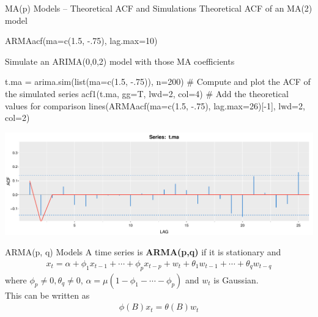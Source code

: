 \documentclass[ignorenonframetext,xcolor=x11names]{beamer}
\begin{document}
\begin{frame}[fragile]{MA(p) Models -- Theoretical ACF and Simulations}
Theoretical ACF of an MA(2) model
\begin{Rcode}
ARMAacf(ma=c(1.5, -.75), lag.max=10)
\end{Rcode}
Simulate an ARIMA(0,0,2) model with those MA coefficients
\begin{Rcode}
t.ma = arima.sim(list(ma=c(1.5, -.75)), n=200)
# Compute and plot the ACF of the simulated series
acf1(t.ma, gg=T, lwd=2, col=4)
# Add the theoretical values for comparison
lines(ARMAacf(ma=c(1.5, -.75), lag.max=26)[-1], 
      lwd=2, col=2)
\end{Rcode}
\begin{center}
\includegraphics[width=.75\textwidth]{figure19.pdf}
\end{center}
\end{frame}



\begin{frame}{ARMA(p, q) Models}
A time series is \textbf{ARMA(p,q)} if it is stationary and
\begin{align*}
x_t = \alpha + \phi_1 x_{t-1} + \cdots + \phi_p x_{t-p} + w_t + \theta_1 w_{t-1} + \cdots + \theta_q w_{t-q} 
\end{align*}
where $\phi_p \neq 0, \theta_q \neq 0$, $\alpha = \mu(1 - \phi_1 - \cdots - \phi_p)$ and $w_t$ is Gaussian. \\

This can be written as
\begin{align*}
\phi(B) x_t = \theta (B) w_t 
\end{align*}
\end{frame}

\end{document}
